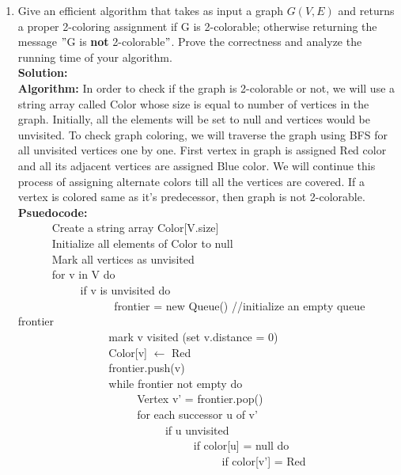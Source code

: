 \documentclass[12pt]{article}
\begin{document}
\begin{enumerate}
\begin{enumerate}
\item Give an efficient algorithm that takes as input a graph $G(V,E)$ and returns a proper 2-coloring assignment if G is 2-colorable; otherwise returning the message $"$G is \textbf{not} 2-colorable$"$. Prove the correctness and analyze the running time of your algorithm. \\
\textbf{Solution:}\\
\textbf{Algorithm:} In order to check if the graph is 2-colorable or not, we will use a string array called Color whose size is equal to number of vertices in the graph. Initially, all the elements will be set to null and vertices would be unvisited. To check graph coloring, we will traverse the graph using BFS for all unvisited vertices one by one. First vertex in graph is assigned Red color and all its adjacent vertices are assigned Blue color. We will continue this process of assigning alternate colors till all the vertices are covered. If a vertex is colored same as it's predecessor, then graph is not 2-colorable.\\
\textbf{Psuedocode:}\\
\verb|		|Create a string array Color[V.size]\\
\verb|		|Initialize all elements of Color to null\\
\verb|		|Mark all vertices as unvisited\\
\verb|		|for v in V do\\
\verb|		|\verb|		|if v is unvisited do \\\
\verb|		|\verb|		|\verb|		|frontier = new Queue() //initialize an empty queue frontier\\
\verb|		|\verb|		|\verb|		|mark v visited (set v.distance = 0)\\
\verb|		|\verb|		|\verb|		|Color[v] $\leftarrow$ Red \\
\verb|		|\verb|		|\verb|		|frontier.push(v)\\
\verb|		|\verb|		|\verb|		|while frontier not empty do\\
\verb|		|\verb|		|\verb|		|\verb|		|Vertex v' = frontier.pop() \\
\verb|		|\verb|		|\verb|		|\verb|		|for each successor u of v'\\
\verb|		|\verb|		|\verb|		|\verb|		|\verb|		|if u unvisited\\
\verb|		|\verb|		|\verb|		|\verb|		|\verb|		|\verb|		|if color[u] = null do\\
\verb|		|\verb|		|\verb|		|\verb|		|\verb|		|\verb|		|\verb|		|if color[v'] = Red\\

\end{enumerate}
\end{enumerate}
\end{document}
